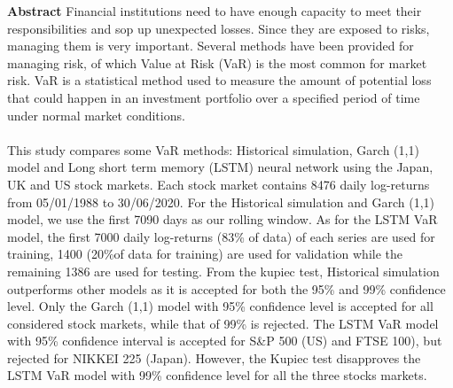 \begin{titlepage}
	\textbf{\LARGE Abstract}\newline\newline
Financial institutions need to have enough capacity to meet their responsibilities and sop up unexpected losses. Since they are exposed to risks, managing them is very important. Several methods have been provided for managing risk, of which Value at Risk (VaR) is the most common for market risk. VaR is a statistical method used to measure the amount of potential loss that could happen in an investment portfolio over a specified period of time under normal market conditions.\\\\ This study compares some VaR methods: Historical simulation, Garch (1,1) model and Long short term memory (LSTM) neural network using the Japan, UK and US stock markets. Each stock market contains 8476 daily log-returns from 05/01/1988 to 30/06/2020. For the Historical simulation and Garch (1,1) model, we use the first 7090 days as our rolling window. As for the LSTM VaR model, the first 7000 daily log-returns (83\% of data) of each series are used for training, 1400 (20\%of data for training) are used for validation while the remaining 1386 are used for testing. From the kupiec test, Historical simulation outperforms other models as it is accepted for both the 95\% and 99\% confidence level. Only the Garch (1,1) model with 95\% confidence level is accepted for all considered stock markets, while that of 99\% is rejected. The LSTM VaR model with 95\% confidence interval is accepted for S\&P 500 (US) and  FTSE 100), but rejected for NIKKEI 225 (Japan). However, the Kupiec test disapproves the LSTM VaR model with 99\% confidence level for all the three stocks markets.


\end{titlepage}
\thispagestyle{empty}

\newpage\null\thispagestyle{empty}\newpage

